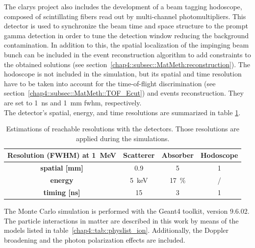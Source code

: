 The \gls{clarys} project also includes the development of a beam tagging hodoscope, composed of scintillating fibers read out by multi-channel photomultipliers. This detector is used to synchronize the beam time and space structure to the prompt gamma detection in order to tune the detection window reducing the background contamination. In addition to this, the spatial localization of the impinging beam bunch can be included in the event reconstruction algorithm to add constraints to the obtained solutions (see section~\ref{chap4::subsec::MatMeth:reconstruction}). The hodoscope is not included in the simulation, but its spatial and time resolution have to be taken into account for the time-of-flight discrimination (see section~\ref{chap4::subsec::MatMeth::TOF_Ecut}) and events reconstruction. They are set to 1~ns and 1~mm \gls{fwhm}, respectively.\\ 
The detector's spatial, energy, and time resolutions are summarized in table \ref{chap4::tab::table_resolution_detectors_CC_simulation_Hadronth}.

\begin{table}[!htbp]

\centering
\caption{Estimations of reachable resolutions with the detectors. Those resolutions are applied during the simulations.}
\label{chap4::tab::table_resolution_detectors_CC_simulation_Hadronth}
\begin{tabular}{cccc}
\toprule
\rowcolor{myColorMainA!20} 
\textbf{Resolution (FWHM) at 1~MeV} & \textbf{Scatterer} & \textbf{Absorber} & \textbf{Hodoscope}\\
\midrule
\textbf{spatial [mm]	}			 &     0.9		 &  5 &	 1\\
\textbf{energy}				&	5~keV		&  17~\%	&	/\\
\textbf{timing [ns]}	        		&	15			&	3 	&  1\\
\bottomrule
\end{tabular}
\end{table}
    
The Monte Carlo simulation is performed with the Geant4 toolkit, version 9.6.02. 
The particle interactions in matter are described in this work by means of the models listed in table~\ref{chap4::tab::physlist_ion}. Additionally, the Doppler broadening and the photon polarization effects are included.
 
